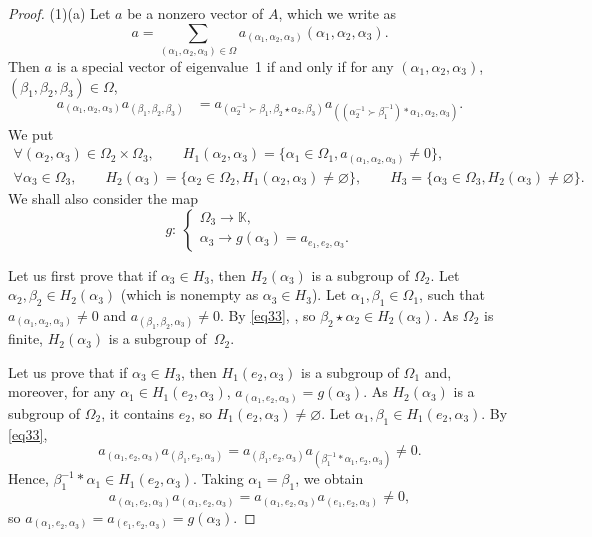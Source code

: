 \documentclass[10pt,a4paper]{amsart}
\numberwithin{equation}{section}
\begin{document}
\begin{proof}
(1)(a) Let $a$ be a nonzero vector of $A$, which we write as
\[a=\sum_{(\alpha_1,\alpha_2,\alpha_3)\in \Omega}a_{(\alpha_1,\alpha_2,\alpha_3)}(\alpha_1,\alpha_2,\alpha_3).\]
Then $a$ is a special vector of eigenvalue~1 if and only if for any $(\alpha_1,\alpha_2,\alpha_3)$, $(\beta_1,\beta_2,\beta_3)\in \Omega$,
\begin{align}
\label{eq33}a_{(\alpha_1,\alpha_2,\alpha_3)}a_{(\beta_1,\beta_2,\beta_3)}&=a_{(\alpha_2^{-1}\succ \beta_1,\beta_2\star \alpha_2,\beta_3)}a_{((\alpha_2^{-1}\succ \beta_1^{-1})*\alpha_1,\alpha_2,\alpha_3)}.
\end{align}
We put
\begin{gather*}
 \forall (\alpha_2,\alpha_3)\in \Omega_2\times \Omega_3,\qquad H_1(\alpha_2,\alpha_3)=\{\alpha_1\in \Omega_1, a_{(\alpha_1,\alpha_2,\alpha_3)}\neq 0\},\\
 \forall \alpha_3\in \Omega_3,\qquad H_2(\alpha_3)=\{\alpha_2\in \Omega_2, H_1(\alpha_2,\alpha_3)\neq \varnothing\},\qquad
 H_3=\{\alpha_3\in \Omega_3, H_2(\alpha_3)\neq \varnothing\}.
\end{gather*}
We shall also consider the map
\[g\colon \ \begin{cases}
\Omega_3 \longrightarrow \mathbb{K},\\
\alpha_3 \longrightarrow g(\alpha_3)=a_{e_1,e_2,\alpha_3}.
\end{cases}\]

Let us first prove that if $\alpha_3\in H_3$, then $H_2(\alpha_3)$ is a subgroup of $\Omega_2$. Let $\alpha_2,\beta_2\in H_2(\alpha_3)$ (which is nonempty as $\alpha_3\in H_3$).
Let $\alpha_1,\beta_1\in \Omega_1$, such that $a_{(\alpha_1,\alpha_2,\alpha_3)}\neq 0$ and $a_{(\beta_1,\beta_2,\alpha_3)}\neq 0$. By \eqref{eq33},
,
so $\beta_2\star \alpha_2\in H_2(\alpha_3)$. As $\Omega_2$ is finite, $H_2(\alpha_3)$ is a subgroup of~$\Omega_2$.

Let us prove that if $\alpha_3\in H_3$, then $H_1(e_2,\alpha_3)$ is a subgroup of $\Omega_1$ and, moreover, for any $\alpha_1\in H_1(e_2,\alpha_3)$, $a_{(\alpha_1,e_2,\alpha_3)}=g(\alpha_3)$.
As $H_2(\alpha_3)$ is a subgroup of $\Omega_2$, it contains $e_2$, so $H_1(e_2,\alpha_3)\neq \varnothing$. Let $\alpha_1,\beta_1\in H_1(e_2,\alpha_3)$. By \eqref{eq33},
\[a_{(\alpha_1,e_2,\alpha_3)}a_{(\beta_1,e_2,\alpha_3)}=a_{(\beta_1,e_2,\alpha_3)}a_{(\beta_1^{-1}*\alpha_1,e_2,\alpha_3)}\neq 0.\]
Hence, $\beta_1^{-1}*\alpha_1\in H_1(e_2,\alpha_3)$. Taking $\alpha_1=\beta_1$, we obtain{\samepage
\[a_{(\alpha_1,e_2,\alpha_3)}a_{(\alpha_1,e_2,\alpha_3)}=a_{(\alpha_1,e_2,\alpha_3)}a_{(e_1,e_2,\alpha_3)}\neq 0,\]
so $a_{(\alpha_1,e_2,\alpha_3)}=a_{(e_1,e_2,\alpha_3)}=g(\alpha_3)$.}


\end{proof}
\end{document}
